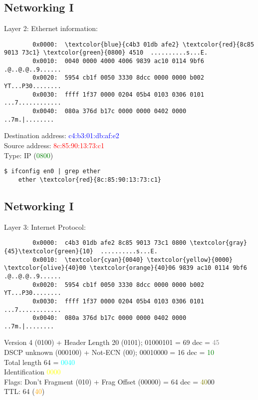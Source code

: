 \documentclass[xga]{xdvislides}
\begin{document}
\subsection{Networking I}
Layer 2: Ethernet information: \\
\begin{Verbatim}
        0x0000:  \textcolor{blue}{c4b3 01db afe2} \textcolor{red}{8c85 9013 73c1} \textcolor{green}{0800} 4510  ..........s...E.
        0x0010:  0040 0000 4000 4006 9839 ac10 0114 9bf6  .@..@.@..9......
        0x0020:  5954 cb1f 0050 3330 8dcc 0000 0000 b002  YT...P30........
        0x0030:  ffff 1f37 0000 0204 05b4 0103 0306 0101  ...7............
        0x0040:  080a 376d b17c 0000 0000 0402 0000       ..7m.|........
\end{Verbatim}

\vspace{.25in}
Destination address: \textcolor{blue}{c4:b3:01:db:af:e2} \\
Source address: \textcolor{red}{8c:85:90:13:73:c1} \\
Type: IP (\textcolor{green}{0800})
\vspace{.25in}

\begin{Verbatim}
$ ifconfig en0 | grep ether
	ether \textcolor{red}{8c:85:90:13:73:c1}
\end{Verbatim}

\subsection{Networking I}
Layer 3: Internet Protocol: \\
\begin{Verbatim}
        0x0000:  c4b3 01db afe2 8c85 9013 73c1 0800 \textcolor{gray}{45}\textcolor{green}{10}  ..........s...E.
        0x0010:  \textcolor{cyan}{0040} \textcolor{yellow}{0000} \textcolor{olive}{40}00 \textcolor{orange}{40}06 9839 ac10 0114 9bf6  .@..@.@..9......
        0x0020:  5954 cb1f 0050 3330 8dcc 0000 0000 b002  YT...P30........
        0x0030:  ffff 1f37 0000 0204 05b4 0103 0306 0101  ...7............
        0x0040:  080a 376d b17c 0000 0000 0402 0000       ..7m.|........
\end{Verbatim}
\vspace{.5in}

Version 4 (0100) + Header Length 20 (0101); 01000101 = 69 dec = \textcolor{gray}{45} \\
DSCP unknown (000100) + Not-ECN (00); 00010000 = 16 dec = \textcolor{green}{10} \\
Total length 64 = \textcolor{cyan}{0040} \\
Identification \textcolor{yellow}{0000} \\
Flags: Don't Fragment (010) + Frag Offset (00000) = 64 dec = \textcolor{olive}{40}00 \\
TTL: 64 (\textcolor{orange}{40}) \\
\end{document}

